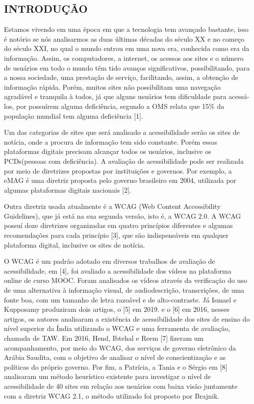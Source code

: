 \documentclass[a4paper]{article}
\begin{document}
\begin{titlepage}
	\begin{center}
		\tableofcontents
	\end{center}
\end{titlepage}
\begin{titlepage}
\section{INTRODUÇÃO}
\fontsize{12pt}{0pt}\selectfont
Estamos vivendo em uma época em que a tecnologia tem avançado bastante, isso é notório se nós analisarmos as duas últimas décadas do século XX e no começo do século XXI, no qual o mundo entrou em uma nova era, conhecida como era da informação. Assim, os computadores, a internet, os acessos aos sites e o número de usuários em todo o mundo têm tido avanços significativos, possibilitando, para a nossa sociedade, uma prestação de serviço, facilitando, assim, a obtenção de informação rápida. Porém, muitos sites não possibilitam uma navegação agradável e tranquila à todos, já que alguns usuários tem dificuldade para acessá-los, por possuírem alguma deficiência, segundo a OMS relata que 15\% da população mundial tem alguma deficiência [1].

Um das categorias de sites que será analisado a acessibilidade serão os sites de notícia, onde a procura de informação tem sido constante. Porém essas plataformas digitais precisam alcançar todos os usuários, inclusive os PCDs(pessoas com deficiência). A avaliação de acessibilidade pode ser realizada por meio de diretrizes propostas por instituições e governos. Por exemplo, a eMAG é uma diretriz proposta pelo governo brasileiro em 2004, utilizada por algumas plataformas digitais nacionais [2].

Outra diretriz usada atualmente é a WCAG (Web Content Accessibility Guidelines), que já está na sua segunda versão, isto é, a WCAG 2.0. A WCAG possuí doze diretrizes organizadas em quatro princípios diferentes e algumas recomendações para cada princípio [3], que são indispensáveis em qualquer plataforma digital, inclusive os sites de notícia.

O WCAG é um padrão adotado em diversos trabalhos de avaliação de acessibilidade, em [4], foi avaliado a acessibilidade dos vídeos na plataforma online de curso MOOC. Foram analisados os vídeos através da verificação do uso de uma alternativa à informação visual, de audiodescrição, transcrições, de uma fonte boa, com um tamanho de letra razoável e de alto-contraste. Já Ismael e Kupposamy produziram dois artigos, o [5] em 2019. e o [6] em 2016, nesses artigos, os autores analisaram a existência de acessibilidade dos sites de ensino do nível superior da Índia utilizando o WCAG e uma ferramenta de avaliação, chamada de TAW. Em 2016, Hend, Ibtehal e Reem [7] fizeram um acompanhamento, por meio do WCAG, dos serviços de governo eletrônico da Arábia Saudita, com o objetivo de analisar o nível de conscientização e as políticas do próprio governo. Por fim, a Patrícia, a Tania e o Sérgio em [8] analisaram um método heurístico existente para investigar o nível de acessibilidade de 40 sites em relação aos usuários com baixa visão juntamente com a diretriz WCAG 2.1, o método utilizado foi proposto por Brajnik.


\end{titlepage}
\end{document}
